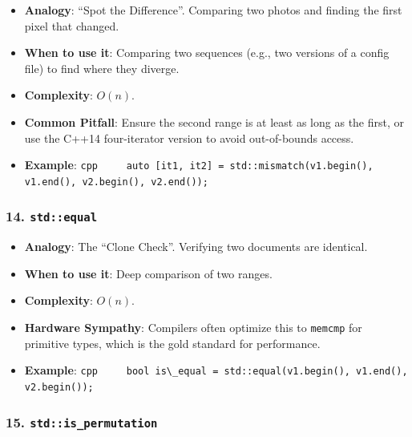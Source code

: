 \begin{itemize}
\tightlist
\item
  \textbf{Analogy}: ``Spot the Difference''. Comparing two photos and
  finding the first pixel that changed.
\item
  \textbf{When to use it}: Comparing two sequences (e.g., two versions
  of a config file) to find where they diverge.
\item
  \textbf{Complexity}: \(O(n)\).
\item
  \textbf{Common Pitfall}: Ensure the second range is at least as long
  as the first, or use the C++14 four-iterator version to avoid
  out-of-bounds access.
\item
  \textbf{Example}:
  \passthrough{\lstinline!cpp     auto [it1, it2] = std::mismatch(v1.begin(), v1.end(), v2.begin(), v2.end());!}
\end{itemize}

\hypertarget{stdequal}{%
\subsubsection{\texorpdfstring{14.
\texttt{std::equal}}{14. std::equal}}\label{stdequal}}

\begin{itemize}
\tightlist
\item
  \textbf{Analogy}: The ``Clone Check''. Verifying two documents are
  identical.
\item
  \textbf{When to use it}: Deep comparison of two ranges.
\item
  \textbf{Complexity}: \(O(n)\).
\item
  \textbf{Hardware Sympathy}: Compilers often optimize this to
  \passthrough{\lstinline!memcmp!} for primitive types, which is the
  gold standard for performance.
\item
  \textbf{Example}:
  \passthrough{\lstinline!cpp     bool is\_equal = std::equal(v1.begin(), v1.end(), v2.begin());!}
\end{itemize}

\hypertarget{stdis_permutation}{%
\subsubsection{\texorpdfstring{15.
\texttt{std::is\_permutation}}{15. std::is\_permutation}}\label{stdis_permutation}}

